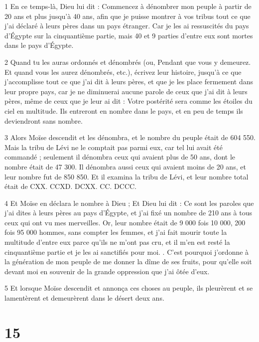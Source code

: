 \par 1 En ce temps-là, Dieu lui dit : Commencez à dénombrer mon peuple à partir de 20 ans et plus jusqu'à 40 ans, afin que je puisse montrer à vos tribus tout ce que j'ai déclaré à leurs pères dans un pays étranger. Car je les ai ressuscités du pays d'Égypte sur la cinquantième partie, mais 40 et 9 parties d'entre eux sont mortes dans le pays d'Égypte.

\par 2 Quand tu les auras ordonnés et dénombrés (ou, Pendant que vous y demeurez. Et quand vous les aurez dénombrés, etc.), écrivez leur histoire, jusqu'à ce que j'accomplisse tout ce que j'ai dit à leurs pères, et que je les place fermement dans leur propre pays, car je ne diminuerai aucune parole de ceux que j'ai dit à leurs pères, même de ceux que je leur ai dit : Votre postérité sera comme les étoiles du ciel en multitude. Ils entreront en nombre dans le pays, et en peu de temps ils deviendront sans nombre.

\par 3 Alors Moïse descendit et les dénombra, et le nombre du peuple était de 604 550. Mais la tribu de Lévi ne le comptait pas parmi eux, car tel lui avait été commandé ; seulement il dénombra ceux qui avaient plus de 50 ans, dont le nombre était de 47 300. Il dénombra aussi ceux qui avaient moins de 20 ans, et leur nombre fut de 850 850. Et il examina la tribu de Lévi, et leur nombre total était de CXX. CCXD. DCXX. CC. DCCC.

\par 4 Et Moïse en déclara le nombre à Dieu ; Et Dieu lui dit : Ce sont les paroles que j'ai dites à leurs pères au pays d'Égypte, et j'ai fixé un nombre de 210 ans à tous ceux qui ont vu mes merveilles. Or, leur nombre était de 9 000 fois 10 000, 200 fois 95 000 hommes, sans compter les femmes, et j'ai fait mourir toute la multitude d'entre eux parce qu'ils ne m'ont pas cru, et il m'en est resté la cinquantième partie et je les ai sanctifiés pour moi. . C'est pourquoi j'ordonne à la génération de mon peuple de me donner la dîme de ses fruits, pour qu'elle soit devant moi en souvenir de la grande oppression que j'ai ôtée d'eux.

\par 5 Et lorsque Moïse descendit et annonça ces choses au peuple, ils pleurèrent et se lamentèrent et demeurèrent dans le désert deux ans.

\chapter{15}

